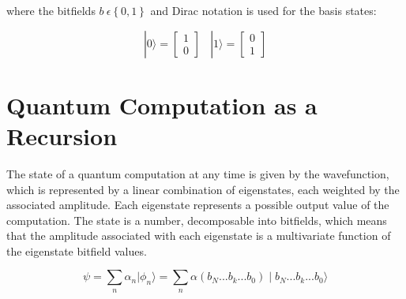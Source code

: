 \documentclass[reqno]{amsart}
\theoremstyle{definition}
\theoremstyle{remark}
\begin{document}
\noindent
where the bitfields $b\: \epsilon \left \{ 0,1 \right \} $ and Dirac notation is used for the basis states:

\begin{equation}
|0\rangle = \begin{bmatrix} 1 \\ 0 \end{bmatrix} \:\:\:\:  |1\rangle = \begin{bmatrix} 0 \\ 1 \end{bmatrix} 
\end{equation}

\newpage
\section{Quantum Computation as a Recursion}
\noindent
The state of a quantum computation at any time is given by the wavefunction, which is represented by a linear combination of eigenstates, each weighted by the associated amplitude. Each eigenstate represents a possible output value of the computation. The state is a number, decomposable into bitfields, which means that the amplitude associated with each eigenstate is a multivariate function of the eigenstate bitfield values.

\begin{equation}
\psi=\sum_{n} \alpha_{n}|\phi_{n} \rangle =\sum_{n} \alpha(b_{N}...b_{k}...b_{0})\mid b_{N}...b_{k}...b_{0}\rangle
\end{equation}
\end{document}
